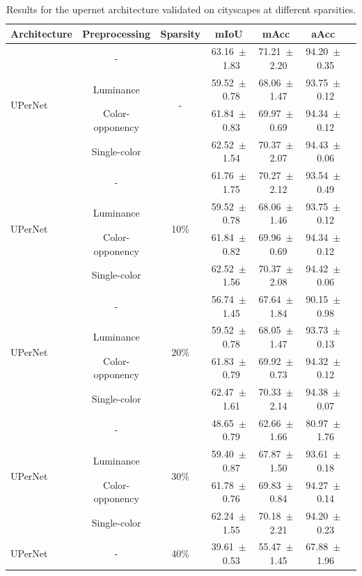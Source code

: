 \begin{table}[h]
\centering
\caption{Results for the upernet architecture validated on cityscapes at different sparsities.}
\begin{tabular}{@{}lccc ccc@{}}
\toprule
Architecture & Preprocessing & Sparsity & mIoU & mAcc & aAcc \\
\midrule

\multirow{4}{*}{UPerNet} & - & \multirow{4}{*}{-} & 63.16~$\pm$~1.83 & 71.21~$\pm$~2.20 & 94.20~$\pm$~0.35 \\
& Luminance & & 59.52~$\pm$~0.78 & 68.06~$\pm$~1.47 & 93.75~$\pm$~0.12 \\
& Color-opponency & & 61.84~$\pm$~0.83 & 69.97~$\pm$~0.69 & 94.34~$\pm$~0.12 \\
& Single-color & & 62.52~$\pm$~1.54 & 70.37~$\pm$~2.07 & 94.43~$\pm$~0.06 \\
\midrule
\multirow{4}{*}{UPerNet} & - & \multirow{4}{*}{10\%} & 61.76~$\pm$~1.75 & 70.27~$\pm$~2.12 & 93.54~$\pm$~0.49 \\
& Luminance & & 59.52~$\pm$~0.78 & 68.06~$\pm$~1.46 & 93.75~$\pm$~0.12 \\
& Color-opponency & & 61.84~$\pm$~0.82 & 69.96~$\pm$~0.69 & 94.34~$\pm$~0.12 \\
& Single-color & & 62.52~$\pm$~1.56 & 70.37~$\pm$~2.08 & 94.42~$\pm$~0.06 \\
\midrule
\multirow{4}{*}{UPerNet} & - & \multirow{4}{*}{20\%} & 56.74~$\pm$~1.45 & 67.64~$\pm$~1.84 & 90.15~$\pm$~0.98 \\
& Luminance & & 59.52~$\pm$~0.78 & 68.05~$\pm$~1.47 & 93.73~$\pm$~0.13 \\
& Color-opponency & & 61.83~$\pm$~0.79 & 69.92~$\pm$~0.73 & 94.32~$\pm$~0.12 \\
& Single-color & & 62.47~$\pm$~1.61 & 70.33~$\pm$~2.14 & 94.38~$\pm$~0.07 \\
\midrule
\multirow{4}{*}{UPerNet} & - & \multirow{4}{*}{30\%} & 48.65~$\pm$~0.79 & 62.66~$\pm$~1.66 & 80.97~$\pm$~1.76 \\
& Luminance & & 59.40~$\pm$~0.87 & 67.87~$\pm$~1.50 & 93.61~$\pm$~0.18 \\
& Color-opponency & & 61.78~$\pm$~0.76 & 69.83~$\pm$~0.84 & 94.27~$\pm$~0.14 \\
& Single-color & & 62.24~$\pm$~1.55 & 70.18~$\pm$~2.21 & 94.20~$\pm$~0.23 \\
\midrule
\multirow{4}{*}{UPerNet} & - & \multirow{4}{*}{40\%} & 39.61~$\pm$~0.53 & 55.47~$\pm$~1.45 & 67.88~$\pm$~1.96 \\

\end{tabular}
\end{table}
